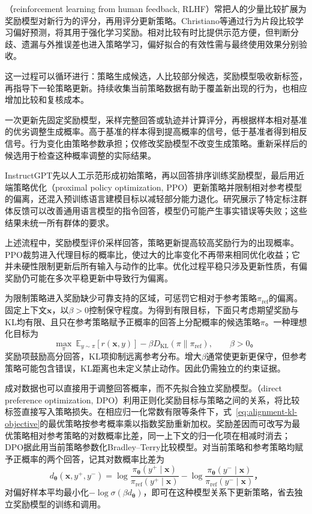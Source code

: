（reinforcement learning from human feedback, RLHF）常把人的少量比较扩展为奖励模型对新行为的评分，再用评分更新策略。Christiano等通过行为片段比较学习偏好预测，将其用于强化学习奖励。相对比较有时比提供示范方便，但判断分歧、遗漏与外推误差也进入策略学习，偏好拟合的有效性需与最终使用效果分别验收。

这一过程可以循环进行：策略生成候选，人比较部分候选，奖励模型吸收新标签，再指导下一轮策略更新。持续收集当前策略数据有助于覆盖新出现的行为，也相应增加比较和复核成本。

一次更新先固定奖励模型，采样完整回答或轨迹并计算评分，再根据样本相对基准的优劣调整生成概率。高于基准的样本得到提高概率的信号，低于基准者得到相反信号。行为变化由策略参数承担；仅修改奖励模型不改变生成策略。重新采样后的候选用于检查这种概率调整的实际结果。

InstructGPT先以人工示范形成初始策略，再以回答排序训练奖励模型，最后用近端策略优化（proximal policy optimization, PPO）更新策略并限制相对参考模型的偏离，还混入预训练语言建模目标以减轻部分能力退化。研究展示了特定标注群体反馈可以改善通用语言模型的指令回答，模型仍可能产生事实错误等失败；这些结果未统一所有群体的要求。

上述流程中，奖励模型评价采样回答，策略更新提高较高奖励行为的出现概率。PPO裁剪进入代理目标的概率比，使过大的比率变化不再带来相同优化收益；它并未硬性限制更新后所有输入与动作的比率。优化过程平稳只涉及更新性质，有偏奖励仍可能在多次平稳更新中导致行为偏离。

为限制策略进入奖励缺少可靠支持的区域，可惩罚它相对于参考策略$\pi_{\mathrm{ref}}$的偏离。固定上下文$\bm{x}$，以$\beta>0$控制保守程度。为得到有限目标，下面只考虑期望奖励与KL均有限、且只在参考策略赋予正概率的回答上分配概率的候选策略$\pi$。一种理想化目标为
\begin{equation}
 \max_\pi\
 \mathbb E_{y\sim\pi}[r(\bm{x},y)]
 -\beta D_{\mathrm{KL}}(\pi\|\pi_{\mathrm{ref}}),
 \qquad \beta>0\text{。}
 \label{eq:alignment-kl-objective}
\end{equation}
奖励项鼓励高分回答，KL项抑制远离参考分布。增大$\beta$通常使更新更保守，但参考策略可能包含错误，KL距离也未定义禁止动作。因此仍需独立的约束证据。

成对数据也可以直接用于调整回答概率，而不先拟合独立奖励模型。（direct preference optimization, DPO）利用正则化奖励目标与策略之间的关系，将比较标签直接写入策略损失。在相应归一化常数有限等条件下，式~\eqref{eq:alignment-kl-objective}的最优策略按参考概率乘以指数奖励重新加权。奖励差因而可改写为最优策略相对参考策略的对数概率比差，同一上下文的归一化项在相减时消去；DPO据此用当前策略参数化Bradley--Terry比较模型。对当前策略和参考策略均赋予正概率的两个回答，记其对数概率比差为
\[
 d_{\bm{\theta}}(\bm{x},y^+,y^-)
 =\log\frac{\pi_{\bm{\theta}}(y^+\mid\bm{x})}
              {\pi_{\mathrm{ref}}(y^+\mid\bm{x})}
 -\log\frac{\pi_{\bm{\theta}}(y^-\mid\bm{x})}
              {\pi_{\mathrm{ref}}(y^-\mid\bm{x})}\text{，}
\]
对偏好样本平均最小化$-\log\sigma(\beta d_{\bm\theta})$，即可在这种模型关系下更新策略，省去独立奖励模型的训练和调用。

